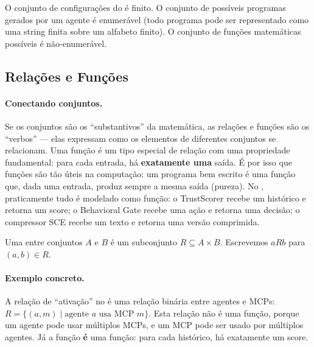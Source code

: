 \begin{exemplo}
    O conjunto de configurações do \opencodeeco{} é finito. O conjunto de
    possíveis programas gerados por um agente é enumerável (todo programa
    pode ser representado como uma string finita sobre um alfabeto finito).
    O conjunto de funções matemáticas possíveis é não-enumerável.
\end{exemplo}

\subsection{Relações e Funções}

\paragraph{Conectando conjuntos.} Se os conjuntos são os ``substantivos'' da
matemática, as relações e funções são os ``verbos'' --- elas expressam como
os elementos de diferentes conjuntos se relacionam. Uma função é um tipo
especial de relação com uma propriedade fundamental: para cada entrada, há
\textbf{exatamente uma} saída. É por isso que funções são tão úteis na
computação: um programa bem escrito é uma função que, dada uma entrada,
produz sempre a mesma saída (pureza). No \opencodeeco{}, praticamente tudo
é modelado como função: o TrustScorer recebe um histórico e retorna um score;
o Behavioral Gate recebe uma ação e retorna uma decisão; o compressor SCE
recebe um texto e retorna uma versão comprimida.

\begin{definicao}
    Uma  entre conjuntos $A$ e $B$ é um subconjunto
    $R \subseteq A \times B$. Escrevemos $aRb$ para $(a,b) \in R$.
\end{definicao}

\paragraph{Exemplo concreto.} A relação de ``ativação'' no \opencodeeco{} é
uma relação binária entre agentes e MCPs: $R = \{ (a, m) \mid \text{agente }
a \text{ usa MCP } m \}$. Esta relação não é uma função, porque um agente
pode usar múltiplos MCPs, e um MCP pode ser usado por múltiplos agentes.
Já a função  \textbf{é} uma função:
para cada histórico, há exatamente um score.

